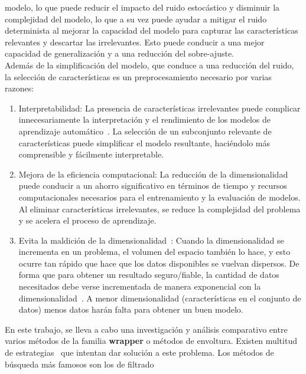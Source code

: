 modelo, lo que puede reducir el impacto del ruido estocástico y disminuir la complejidad del
modelo, lo que a su vez puede ayudar a mitigar el ruido determinista al mejorar la capacidad
del modelo para capturar las características relevantes y descartar las irrelevantes.
Esto puede conducir a una mejor capacidad de generalización y a una reducción del sobre-ajuste.\\[6pt]
Además de la simplificación del modelo, que conduce a una reducción del ruido, la
selección de características es un preprocesamiento necesario por varias razones:
\begin{enumerate}
      \item Interpretabilidad: La presencia de características
            irrelevantes puede complicar innecesariamente la interpretación y el
            rendimiento de los modelos de aprendizaje automático~\cite{miao_survey_2016}. La selección de un
            subconjunto relevante de características puede simplificar el modelo
            resultante, haciéndolo más comprensible y fácilmente interpretable.

      \item Mejora de la eficiencia computacional: La reducción de la
            dimensionalidad puede conducir a un ahorro significativo en términos de
            tiempo y recursos computacionales necesarios para el entrenamiento y la
            evaluación de modelos. Al eliminar características irrelevantes, se reduce
            la complejidad del problema y se acelera el proceso de aprendizaje.

      \item Evita la maldición de la dimensionalidad~\cite{venkat2018curse, bellman1957dynamic}: Cuando la dimensionalidad
            se incrementa en un problema, el volumen del espacio también lo hace, y esto ocurre
            tan rápido que  hace que los datos disponibles se vuelvan dispersos. De forma que para
            obtener un resultado seguro/fiable, la cantidad de datos necesitados debe verse
            incrementada de manera exponencial con la dimensionalidad~\cite{udacity2015curse}. A menor dimensionalidad
            (características en el conjunto de datos) menos datos harán falta para obtener un buen
            modelo.
\end{enumerate}
En este trabajo, se lleva a cabo una investigación y análisis comparativo entre varios métodos
de la familia \textbf{wrapper} o métodos de envoltura. Existen multitud de estrategias~\cite{miao_survey_2016}
que intentan dar solución a este problema. Los métodos de búsqueda más famosos son los de filtrado
